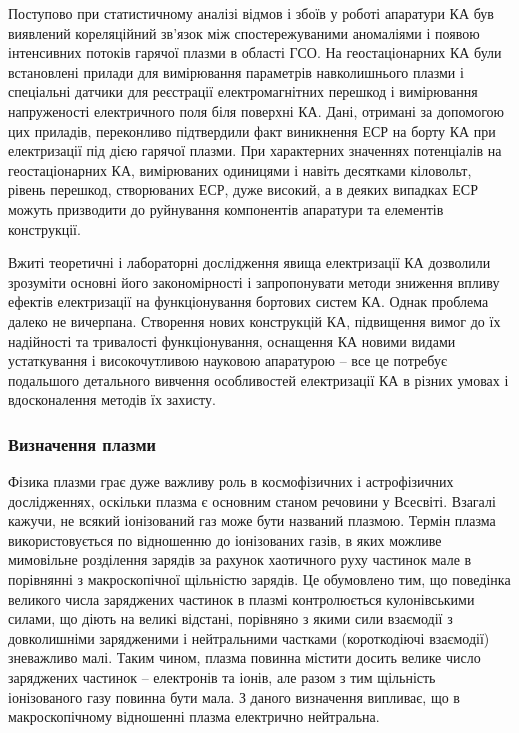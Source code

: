 \documentclass[a4paper,12pt]{article}
\begin{document}
Поступово при статистичному аналізі відмов і збоїв у роботі апаратури КА був виявлений кореляційний зв'язок між спостережуваними аномаліями і появою інтенсивних потоків гарячої плазми в області ГСО. На геостаціонарних КА були встановлені прилади для вимірювання параметрів навколишнього плазми і спеціальні датчики для реєстрації електромагнітних перешкод і вимірювання напруженості електричного поля біля поверхні КА. Дані, отримані за допомогою цих приладів, переконливо підтвердили факт виникнення ЕСР на борту КА при електризації під дією гарячої плазми. При характерних значеннях потенціалів на геостаціонарних КА, вимірюваних одиницями і навіть десятками кіловольт, рівень перешкод, створюваних ЕСР, дуже високий, а в деяких випадках ЕСР можуть призводити до руйнування компонентів апаратури та елементів конструкції.

Вжиті теоретичні і лабораторні дослідження явища електризації КА дозволили зрозуміти основні його закономірності і запропонувати методи зниження впливу ефектів електризації на функціонування бортових систем КА. Однак проблема далеко не вичерпана. Створення нових конструкцій КА, підвищення вимог до їх надійності та тривалості функціонування, оснащення КА новими видами устаткування і високочутливою науковою апаратурою -- все це потребує подальшого детального вивчення особливостей електризації КА в різних умовах і вдосконалення методів їх захисту.\cite{novikov}

\subsubsection{Визначення плазми}
Фізика плазми грає дуже важливу роль в космофізичних і астрофізичних дослідженнях, оскільки плазма є основним станом речовини у Всесвіті. Взагалі кажучи, не всякий іонізований газ може бути названий плазмою. Термін плазма використовується по відношенню до іонізованих газів, в яких можливе мимовільне розділення зарядів за рахунок хаотичного руху частинок мале в порівнянні з макроскопічної щільністю зарядів. Це обумовлено тим, що поведінка великого числа заряджених частинок в плазмі контролюється кулонівськими силами, що діють на великі відстані, порівняно з якими сили взаємодії з довколишніми зарядженими і нейтральними частками (короткодіючі взаємодії) зневажливо малі. Таким чином, плазма повинна містити досить велике число заряджених частинок -- електронів та іонів, але разом з тим щільність іонізованого газу повинна бути мала. З даного визначення випливає, що в макроскопічному відношенні плазма електрично нейтральна.
\end{document}
